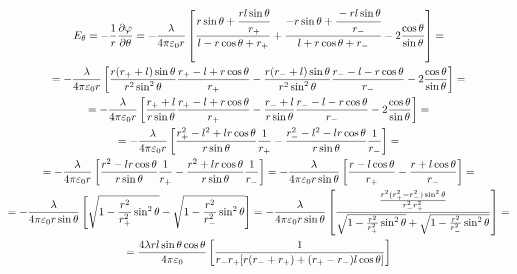 \[
	\begin{gathered}
	E_\theta = -\frac{1}{r} \frac{\partial \varphi}{\partial \theta} = 
	- \frac{\lambda}{4\pi\varepsilon_0 r} 
	\left[
	\frac{r \sin \theta + \cfrac{r l \sin \theta}{r_+}}{l - r \cos \theta + r_+} 
	+
	\frac{- r \sin \theta + \cfrac{- r l \sin \theta}{r_-}}{l + r \cos \theta + r_-} 
	-
	2 \frac{\cos \theta}{\sin \theta}
	\right] 
	= \\ =
	- \frac{\lambda}{4\pi\varepsilon_0 r} 
	\left[
	\frac{r (r_+ + l) \sin \theta}{r^2 \sin^2 \theta} \frac{r_+ - l + r \cos \theta}{r_+}
	- \frac{r (r_- + l) \sin \theta}{r^2 \sin^2 \theta} \frac{r_- - l - r \cos \theta}{r_-}
	- 2 \frac{\cos \theta}{\sin \theta}
	\right] 
	= \\ =
	- \frac{\lambda}{4\pi\varepsilon_0 r} 
	\left[
	\frac{r_+ + l}{r\sin \theta} \frac{r_+ - l + r \cos \theta}{r_+}
	- \frac{r_- + l}{r\sin \theta} \frac{r_- - l - r \cos \theta}{r_-}
	- 2 \frac{\cos \theta}{\sin \theta}
	\right] 
	= \\ =
	- \frac{\lambda}{4\pi\varepsilon_0 r} 
	\left[
	\frac{r_+^2 - l^2 + l r \cos \theta}{r\sin \theta} \frac{1}{r_+}
	- \frac{r_-^2 - l^2 - l r \cos \theta}{r\sin \theta} \frac{1}{r_-}
	\right] 
	= \\ =
	- \frac{\lambda}{4\pi\varepsilon_0 r} 
	\left[
	\frac{r^2 - l r \cos \theta}{r\sin \theta} \frac{1}{r_+}
	- \frac{r^2 + l r \cos \theta}{r\sin \theta} \frac{1}{r_-}
	\right] 
	= 
	- \frac{\lambda}{4\pi\varepsilon_0 r \sin \theta} 
	\left[
	\frac{r - l \cos \theta}{r_+}
	- \frac{r + l \cos \theta}{r_-}
	\right] 
	= \\ =
	- \frac{\lambda}{4\pi\varepsilon_0 r \sin \theta} 
	\left[
	\sqrt{1 - \frac{r^2}{r_+^2} \sin^2 \theta}
	- \sqrt{1 - \frac{r^2}{r_-^2} \sin^2 \theta}
	\right] 
	= 
	- \frac{\lambda}{4\pi\varepsilon_0 r \sin \theta} 
	\left[
	\frac{\frac{r^2 (r_+^2 - r_-^2) \sin^2 \theta}{r_-^2 r_+^2}}{\sqrt{1 - \frac{r^2}{r_+^2} \sin^2 \theta}
	+ \sqrt{1 - \frac{r^2}{r_-^2} \sin^2 \theta}}
	\right] 
	= \\ =
	\frac{4 \lambda r l \sin \theta \cos \theta}{4\pi\varepsilon_0} 
	\left[
	\frac{1}{r_- r_+ [r (r_- + r_+) + (r_+ - r_-) l \cos \theta]}
	\right] 
	\end{gathered}
\]


